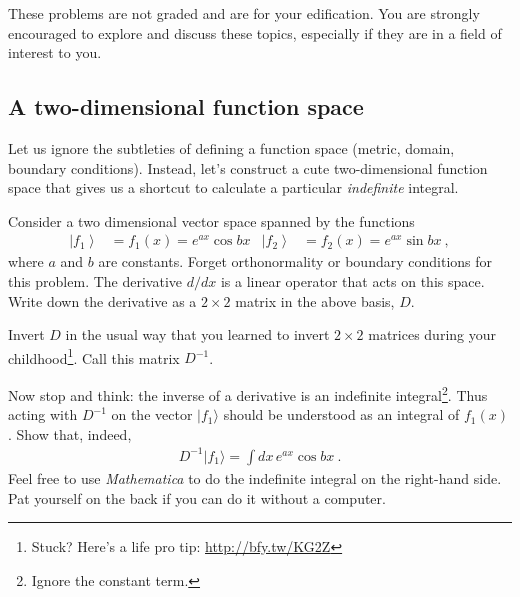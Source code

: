 \documentclass[12pt]{article}
\numberwithin{equation}{subsection}    %
\begin{document}
These problems are not graded and are for your edification. You are strongly encouraged to explore and discuss these topics, especially if they are in a field of interest to you.


\subsection{A two-dimensional function space} 


Let us ignore the subtleties of defining a function space (metric, domain, boundary conditions). Instead, let's construct a cute two-dimensional function space that gives us a shortcut to calculate a particular \emph{indefinite} integral. 

Consider a two dimensional vector space spanned by the functions
\begin{align}
	\left|f_1\right\rangle
	&= f_1(x) = 
	e^{ax} \cos bx
	&
	\left|f_2\right\rangle
	&=
	f_2(x) = 
	e^{ax} \sin bx \ ,
\end{align}
where $a$ and $b$ are constants. Forget orthonormality or boundary conditions for this problem. The derivative $d/dx$ is a linear operator that acts on this space. Write down the derivative as a $2\times 2$ matrix in the above basis, $D$.

Invert $D$ in the usual way that you learned to invert $2\times 2$ matrices during your childhood\footnote{Stuck? Here's a life pro tip: \url{http://bfy.tw/KG2Z}}. Call this matrix $D^{-1}$. 

Now stop and think: the inverse of a derivative is an indefinite integral\footnote{Ignore the constant term.}. Thus acting with $D^{-1}$ on the vector $|f_1\rangle$ should be understood as an integral of $f_1(x)$. Show that, indeed,
\begin{align}
	D^{-1} |f_1\rangle = \int dx\, e^{ax} \cos bx \ .
\end{align}
Feel free to use \emph{Mathematica} to do the indefinite integral on the right-hand side. Pat yourself on the back if you can do it without a computer.
\end{document}
